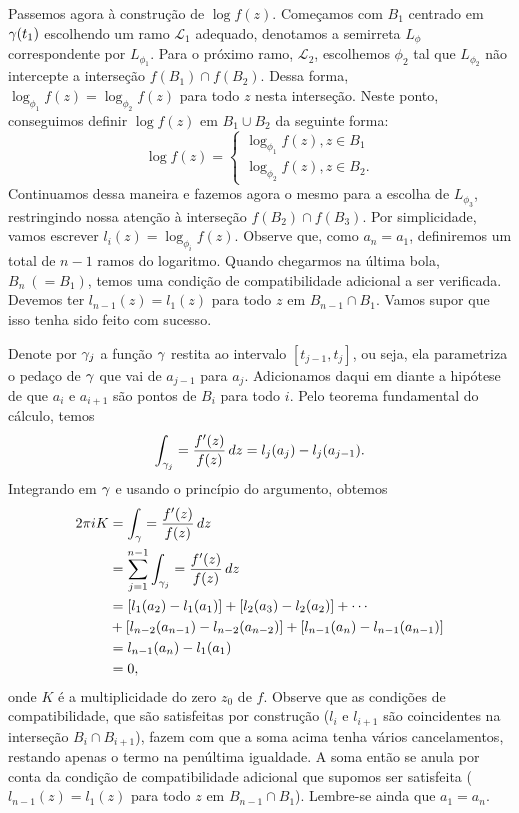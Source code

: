     Passemos agora à construção de $\log f(z)$. Começamos com $B_1$ centrado em $\gamma(t_1)$
    escolhendo um ramo $\mathcal{L}_1$ adequado, denotamos a semirreta $L_\phi$ correspondente por
    $L_{\phi_1}$. Para o próximo ramo, $\mathcal{L}_2$, escolhemos $\phi_2$ tal que $L_{\phi_2}$
    não intercepte a interseção $f(B_1) \cap f(B_2)$. Dessa forma, 
    $\log_{\phi_1} f(z) = \log_{\phi_2} f(z)$ para todo $z$ nesta interseção. 
    Neste ponto, conseguimos definir $\log f(z)$ em $B_1 \cup B_2$ da seguinte forma:
    \begin{equation*}
        \log f(z) =
        \begin{cases}
            \log_{\phi_1} f(z), z \in B_1 \\
            \log_{\phi_2} f(z), z \in B_2.
        \end{cases}
    \end{equation*}
    Continuamos dessa maneira e fazemos agora o mesmo para a escolha de $L_{\phi_3}$, 
    restringindo nossa atenção à interseção $f(B_2) \cap f(B_3)$. Por simplicidade, 
    vamos escrever $l_i(z) =  \log_{\phi_i} f(z)$. Observe que, como $a_n = a_1$, 
    definiremos um total de $n-1$ ramos do logaritmo. Quando chegarmos na última bola, 
    $B_n \ (= B_1)$, temos uma condição de compatibilidade adicional a ser verificada. 
    Devemos ter $l_{n-1}(z) = l_1(z)$ para todo $z$ em $B_{n-1} \cap B_1$. Vamos supor que isso
    tenha sido feito com sucesso.
    
    Denote por $\gamma_j$ a função $\gamma$ restita ao intervalo $[t_{j-1},t_j]$, ou seja, ela
    parametriza o pedaço de $\gamma$ que vai de $a_{j-1}$ para $a_j$. Adicionamos daqui em diante 
    a hipótese de que $a_i$ e $a_{i+1}$ são pontos de $B_i$ para todo $i$. Pelo teorema fundamental
    do cálculo, temos
    \begin{equation*}
        \int_{\gamma_j} = \frac{f'(z)}{f(z)}\, dz = l_j(a_j) - l_j(a_{j-1}).  
    \end{equation*}
    Integrando em $\gamma$ e usando o princípio do argumento, obtemos
    \begin{align*}
        2 \pi i K &= \int_{\gamma} = \frac{f'(z)}{f(z)}\, dz \\
        &= \sum_{j=1}^{n-1}\int_{\gamma_j} = \frac{f'(z)}{f(z)}\, dz \\
        &= [l_1(a_2) - l_1(a_1)] + [l_2(a_3) - l_2(a_2)] + \cdots \\
        &+ [l_{n-2}(a_{n-1}) - l_{n-2}(a_{n-2})] + [l_{n-1}(a_{n}) - l_{n-1}(a_{n-1})] \\
        &= l_{n-1}(a_n) - l_1(a_1)\\
        &= 0,
    \end{align*}
    onde $K$ é a multiplicidade do zero $z_0$ de $f$. Observe que as condições de compatibilidade,
    que são satisfeitas por construção ($l_i$ e $l_{i+1}$ são coincidentes na interseção 
    $B_i \cap B_{i+1}$), fazem com que a soma acima tenha vários cancelamentos, restando apenas o
    termo na penúltima igualdade. A soma então se anula por conta da condição de compatibilidade
    adicional que supomos ser satisfeita ($l_{n-1}(z) = l_1(z)$ para todo $z$ em 
    $B_{n-1} \cap B_1$). Lembre-se ainda que $a_1 = a_n$.
    
